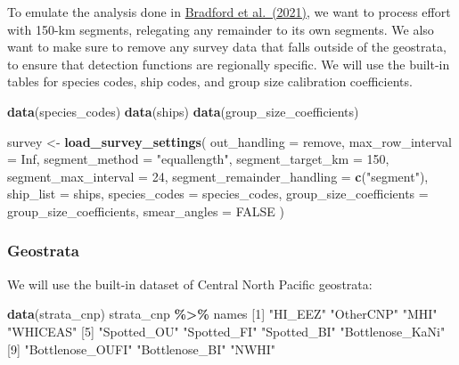 \documentclass[
]{book}
\newenvironment{Shaded}{\begin{snugshade}}{\end{snugshade}}
\newcommand{\AttributeTok}[1]{\textcolor[rgb]{0.13,0.29,0.53}{#1}}
\newcommand{\ConstantTok}[1]{\textcolor[rgb]{0.56,0.35,0.01}{#1}}
\newcommand{\DecValTok}[1]{\textcolor[rgb]{0.00,0.00,0.81}{#1}}
\newcommand{\FunctionTok}[1]{\textcolor[rgb]{0.13,0.29,0.53}{\textbf{#1}}}
\newcommand{\NormalTok}[1]{#1}
\newcommand{\OtherTok}[1]{\textcolor[rgb]{0.56,0.35,0.01}{#1}}
\newcommand{\SpecialCharTok}[1]{\textcolor[rgb]{0.81,0.36,0.00}{\textbf{#1}}}
\newcommand{\StringTok}[1]{\textcolor[rgb]{0.31,0.60,0.02}{#1}}
\begin{document}
To emulate the analysis done in \href{https://repository.library.noaa.gov/view/noaa/47788}{Bradford et al.~(2021)}, we want to process effort with 150-km segments, relegating any remainder to its own segments. We also want to make sure to remove any survey data that falls outside of the geostrata, to ensure that detection functions are regionally specific. We will use the built-in tables for species codes, ship codes, and group size calibration coefficients.

\begin{Shaded}
\begin{Highlighting}[]
\FunctionTok{data}\NormalTok{(species\_codes)}
\FunctionTok{data}\NormalTok{(ships)}
\FunctionTok{data}\NormalTok{(group\_size\_coefficients)}

\NormalTok{survey }\OtherTok{\textless{}{-}} \FunctionTok{load\_survey\_settings}\NormalTok{(}
  \AttributeTok{out\_handling =} \StringTok{\textquotesingle{}remove\textquotesingle{}}\NormalTok{,}
  \AttributeTok{max\_row\_interval =} \ConstantTok{Inf}\NormalTok{,}
  \AttributeTok{segment\_method =} \StringTok{"equallength"}\NormalTok{,}
  \AttributeTok{segment\_target\_km =} \DecValTok{150}\NormalTok{,}
  \AttributeTok{segment\_max\_interval =} \DecValTok{24}\NormalTok{,}
  \AttributeTok{segment\_remainder\_handling =} \FunctionTok{c}\NormalTok{(}\StringTok{"segment"}\NormalTok{),}
  \AttributeTok{ship\_list =}\NormalTok{ ships,}
  \AttributeTok{species\_codes =}\NormalTok{ species\_codes,}
  \AttributeTok{group\_size\_coefficients =}\NormalTok{ group\_size\_coefficients,}
  \AttributeTok{smear\_angles =} \ConstantTok{FALSE}
\NormalTok{)}
\end{Highlighting}
\end{Shaded}

\hypertarget{geostrata}{%
\subsubsection*{Geostrata}\label{geostrata}}

We will use the built-in dataset of Central North Pacific geostrata:

\begin{Shaded}
\begin{Highlighting}[]
\FunctionTok{data}\NormalTok{(strata\_cnp)}
\NormalTok{strata\_cnp }\SpecialCharTok{\%\textgreater{}\%}\NormalTok{ names}
\NormalTok{ [}\DecValTok{1}\NormalTok{] }\StringTok{"HI\_EEZ"}          \StringTok{"OtherCNP"}        \StringTok{"MHI"}             \StringTok{"WHICEAS"}        
\NormalTok{ [}\DecValTok{5}\NormalTok{] }\StringTok{"Spotted\_OU"}      \StringTok{"Spotted\_FI"}      \StringTok{"Spotted\_BI"}      \StringTok{"Bottlenose\_KaNi"}
\NormalTok{ [}\DecValTok{9}\NormalTok{] }\StringTok{"Bottlenose\_OUFI"} \StringTok{"Bottlenose\_BI"}   \StringTok{"NWHI"}           
\end{Highlighting}
\end{Shaded}
\end{document}
